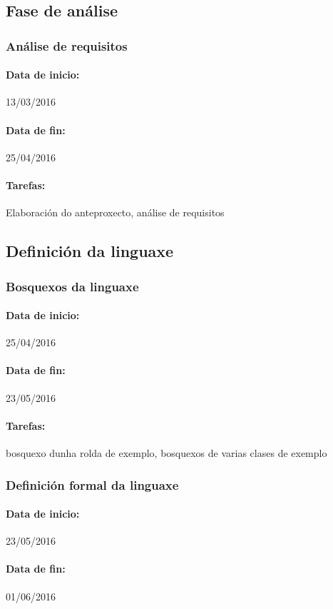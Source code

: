 \subsection{Fase de análise}
\subsubsection{Análise de requisitos}
\paragraph{Data de inicio:} 13/03/2016
\paragraph{Data de fin:} 25/04/2016
\paragraph{Tarefas:} Elaboración do anteproxecto, análise de requisitos


\subsection{Definición da linguaxe}
\subsubsection{Bosquexos da linguaxe}
\paragraph{Data de inicio:} 25/04/2016
\paragraph{Data de fin:} 23/05/2016
\paragraph{Tarefas:} bosquexo dunha rolda de exemplo, bosquexos de varias clases
de exemplo

\subsubsection{Definición formal da linguaxe}
\paragraph{Data de inicio:} 23/05/2016
\paragraph{Data de fin:} 01/06/2016
